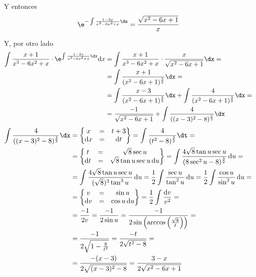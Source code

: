 \documentclass[../../main.tex]{subfiles}
\begin{document}
  Y entonces
  $$
  \e^{- \int \frac{1 - 3x}{x^3 - 6 x^2 + x} \dx} = \frac{\sqrt{x^2 - 6x + 1}}{x}
  $$

  Y, por otro lado
  \begin{equation*}
    \begin{split}
      \int \frac{x + 1}{x^3 - 6 x^2 + x} \cdot \e^{\int \frac{1 - 3x}{x^3 - 6 x^2 +x} \dx} \text{d}x & =
      \int \frac{x + 1}{x^3 - 6 x^2 + x} \cdot \frac{x}{\sqrt{x^2 - 6x + 1}} \dx = \\ & =
      \int \frac{x + 1}{(x^2 - 6 x + 1)^{\frac{3}{2}}} \dx = \\ & =
      \int \frac{x - 3}{(x^2 - 6 x + 1)^{\frac{3}{2}}} \dx + \int \frac{4}{(x^2 - 6 x + 1)^{\frac{3}{2}}} \dx = \\ & =
      \frac{-1}{\sqrt{x^2 - 6x + 1}} + \int \frac{4}{((x - 3)^2 - 8)^{\frac{3}{2}}} \dx
    \end{split}
  \end{equation*}
  \begin{equation*}
    \begin{split}
      \int \frac{4}{((x - 3)^2 - 8)^{\frac{3}{2}}} \dx & =
      \left\{
        \begin{matrix}
          x & = & t + 3 \\
          \text{d}x & = & \text{d}t
        \end{matrix}
      \right\} =
      \int \frac{4}{(t^2 - 8)^{\frac{3}{2}}} \dt = \\ & =
      \left\{
        \begin{matrix}
          t & = & \sqrt{8}\sec{u} \\
          \text{d}t & = & \sqrt{8}\tan{u}\sec{u} \,\text{d}u
        \end{matrix}
      \right\} =
      \int \frac{4 \sqrt{8}\tan{u}\sec{u}}{(8\sec^2{u} - 8)^{\frac{3}{2}}} \,\text{d}u = \\ & =
      \int \frac{4\sqrt{8}\tan{u}\sec{u}}{(\sqrt{8})^3 \tan^3{u}} \,\text{d}u = \frac{1}{2} \int \frac{\sec{u}}{\tan^2{u}} \,\text{d}u = \frac{1}{2} \int \frac{\cos{u}}{\sin^2{u}} \,\text{d}u = \\ & =
      \left\{
        \begin{matrix}
          v & = & \sin{u} \\
          \text{d}v & = & \cos{u} \,\text{d}u
        \end{matrix}
      \right\} =
      \frac{1}{2} \int \frac{\text{d}v}{v^2} = \\ & =
      \frac{-1}{2v} = \frac{-1}{2 \sin{u}} = \frac{-1}{2 \sin{\left(\arccos{\left(\frac{\sqrt{8}}{t}\right)}\right)}} = \\ & =
      \frac{-1}{2 \sqrt{1 - \frac{8}{t^2}}} = \frac{-t}{2 \sqrt{t^2 - 8}} = \\ & =
      \frac{-(x - 3)}{2 \sqrt{(x - 3)^2 - 8}} = \frac{3 - x}{2 \sqrt{x^2 - 6x + 1}}
    \end{split}
  \end{equation*}
\end{document}
